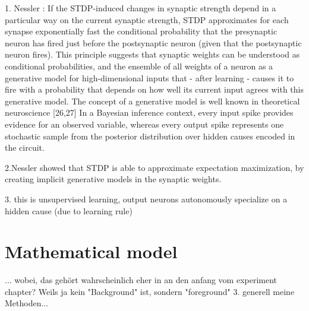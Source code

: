 1. Nessler : If the STDP-induced changes in
synaptic strength depend in a particular way on the current
synaptic strength, STDP approximates for each synapse exponentially fast the conditional probability that the presynaptic neuron
has fired just before the postsynaptic neuron (given that the
postsynaptic neuron fires). This principle suggests that synaptic
weights can be understood as conditional probabilities, and the
ensemble of all weights of a neuron as a generative model for high-dimensional inputs that - after learning - causes it to fire with a
probability that depends on how well its current input agrees with
this generative model. The concept of a generative model is well
known in theoretical neuroscience [26,27]
 In a Bayesian inference context, every input
spike provides evidence for an observed variable, whereas every
output spike represents one stochastic sample from the posterior
distribution over hidden causes encoded in the circuit.

2.Nessler showed that STDP is able to approximate expectation maximization, by creating implicit generative models in the synaptic weights.

3. this is unsupervised learning, output neurons autonomously specialize on a hidden cause (due to learning rule)

\section{Mathematical model}

... wobei, das gehört wahrscheinlich eher in an den anfang vom experiment chapter? Weils ja kein "Background" ist, sondern "foreground"
3. generell meine Methoden...